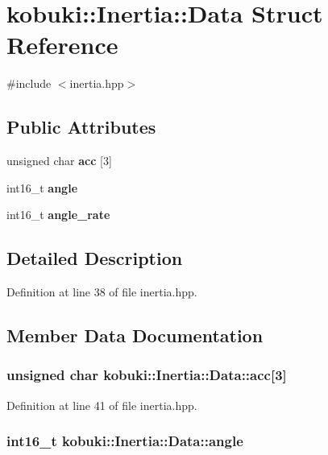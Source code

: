 \section{kobuki\-:\-:\-Inertia\-:\-:\-Data \-Struct \-Reference}
\label{structkobuki_1_1Inertia_1_1Data}


{\ttfamily \#include $<$inertia.\-hpp$>$}

\subsection*{\-Public \-Attributes}
\begin{DoxyCompactItemize}
\item 
unsigned char {\bf acc} [3]
\item 
int16\-\_\-t {\bf angle}
\item 
int16\-\_\-t {\bf angle\-\_\-rate}
\end{DoxyCompactItemize}


\subsection{\-Detailed \-Description}


\-Definition at line 38 of file inertia.\-hpp.



\subsection{\-Member \-Data \-Documentation}
\subsubsection[{acc}]{\setlength{\rightskip}{0pt plus 5cm}unsigned char {\bf kobuki\-::\-Inertia\-::\-Data\-::acc}[3]}\label{structkobuki_1_1Inertia_1_1Data_a0ad4a7f653724bcedcb5d0eea0347352}


\-Definition at line 41 of file inertia.\-hpp.

\subsubsection[{angle}]{\setlength{\rightskip}{0pt plus 5cm}int16\-\_\-t {\bf kobuki\-::\-Inertia\-::\-Data\-::angle}}\label{structkobuki_1_1Inertia_1_1Data_a482542389a45c932f36ce4cda902babc}


